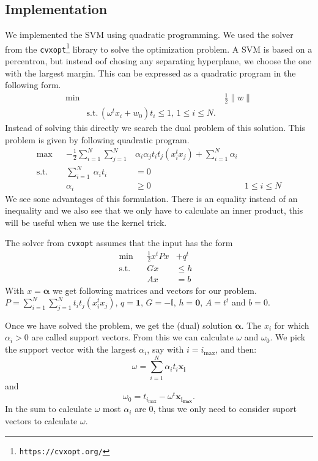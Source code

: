 \subsection{Implementation}
We implemented the SVM using quadratic programming. We used the solver from the \texttt{cvxopt\footnote{https://cvxopt.org/}} library to solve the optimization problem. A SVM is based on a percentron, but instead oof chosing any separating hyperplane, we choose the one with the largest margin. This can be expressed as a quadratic program in the following form.
\begin{align*}
	\min&&\, \frac{1}{2}\lVert w \rVert \\
	&\text{s.t.}\, (\omega^tx_i+w_0)t_i \leq 1\text{,    } 1 \leq i \leq N.
\end{align*}
Instead of solving this directly we search the dual problem of this solution. This problem is given by following quadratic program.
\begin{align*}
	\max&& - \frac{1}{2} \sum\limits_{i=1}^N \sum\limits_{j=1}^N&\alpha_i\alpha_jt_it_j(x_i^tx_j) +  \sum\limits_{i=1}^N \alpha_i &\\
	\text{s.t.}&& \sum\limits_{i=1}^N\ \alpha_i t_i &= 0& \\
	&&\alpha_i&\geq0& 1\leq i \leq N
\end{align*}
We see sone advantages of this formulation. There is an equality instead of an inequality and we also see that we only have to calculate an inner product, this will be useful when we use the kernel trick.

The solver from \texttt{cvxopt} assumes that the input has the form
\begin{align*}
	\min&& \frac{1}{2} x^tPx &+ q^t&\\
	\text{s.t.}&&Gx&\leq h& \\
	&&Ax&=b& 
\end{align*}
With $x=\bm{\alpha}$ we get following matrices and vectors for our problem. $P=\sum\limits_{i=1}^N \sum\limits_{j=1}^Nt_it_j(x_i^tx_j)$, $q=\bm{1}$, 
$G=-\mathbb{I}$, $h=\bm{0}$, $A=t^t$ and $b=0$.

Once we have solved the problem, we get the (dual) solution $\bm{\alpha}$. The $x_i$ for which $\alpha_i>0$ are called support vectors. From this we can calculate $\omega$ and $\omega_0$. We pick the support vector with the largest $\alpha_i$, say with $i = i_{\max}$, and then:
\[
	\omega = \sum\limits_{i=1}^N\alpha_i t_i \bm{x_i}
\]
and 
\[
	\omega_0 = t_{i_{\max}} - \omega^t\bm{x_{i_{\max}}}.
\]
In the sum to calculate $\omega$ most $\alpha_i$ are $0$, thus we only need to consider suport vectors to calculate $\omega$.

